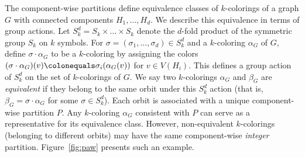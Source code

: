 \documentclass{amsart}
\theoremstyle{hypothesisstyle}
\theoremstyle{definition}
\theoremstyle{remark}
\numberwithin{equation}{section}
\begin{document}
The component-wise partitions define equivalence classes of $k$-colorings of a graph $G$ with connected components $H_1,\dots,H_d$. We describe this equivalence in terms of group actions. Let $S_k^d = S_k\times \dots \times S_k$ denote the $d$-fold product of the symmetric group $S_k$ on $k$ symbols. For $\sigma=(\sigma_1,\dots,\sigma_d)\in S_k^d$ and a $k$-coloring $\alpha_G$ of $G$, define $\sigma\cdot \alpha_G$ to be a $k$-coloring by assigning the colors $(\sigma\cdot \alpha_G)(v) \colonequals \sigma_i(\alpha_G(v))$ for $v\in V(H_i)$. This defines a group action of $S_k^{d}$ on the set of $k$-colorings of $G$. We say two $k$-colorings $\alpha_G$ and $\beta_G$ are {\em equivalent} if they belong to the same orbit under this $S_k^{d}$ action (that is, $\beta_G=\sigma\cdot \alpha_G$ for some $\sigma\in S_k^{d}$). Each orbit is associated with a unique component-wise partition $P$. Any $k$-coloring $\alpha_G$ consistent with $P$ can serve as a representative for its equivalence class. However, non-equivalent $k$-colorings (belonging to different orbits) may have the same component-wise {\em integer} partition. Figure~\ref{fig:paw} presents such an example.
\end{document}

